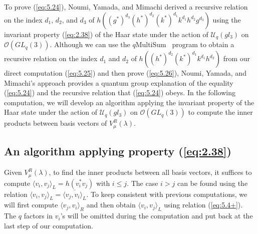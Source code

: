 \documentclass[table,a4paper,reqno]{amsart}
\numberwithin{equation}{section}
\theoremstyle{definition}
\begin{document}
To prove (\ref{eq:5.24}), Noumi, Yamada, and Mimachi derived a recursive relation on the index $d_1$, $d_2$, and $d_3$ of $h((g^*)^{d_3}(h^*)^{d_2}(k^*)^{d_1}k^{d_1}h^{d_2}g^{d_3})$ using the invariant property (\ref{eq:2.38}) of the Haar state under the action of $\mathcal{U}_q(gl_3)$ on $\mathcal{O}(GL_q(3))$. Although we can use the $q$MultiSum~\cite{riese2003qmultisum} program to obtain a recursive relation on the index $d_1$ and $d_2$ of $h((h^*)^{d_2}(k^*)^{d_1}k^{d_1}h^{d_2})$ from our direct computation (\ref{eq:5.25}) and then prove (\ref{eq:5.26}), Noumi, Yamada, and Mimachi's approach provides a quantum group explanation of the equality (\ref{eq:5.24}) and the recursive relation that (\ref{eq:5.24}) obeys. In the following computation, we will develop an algorithm applying the invariant property of the Haar state under the action of $\mathcal{U}_q(gl_3)$ on $\mathcal{O}(GL_q(3))$ to compute the inner products between basis vectors of $V^R_\mu(\lambda)$.

\subsection{An algorithm applying property (\ref{eq:2.38}) }
Given $V_\mu^R(\lambda)$, to find the inner products between all basis vectors, it suffices to compute $\langle v_i,v_j\rangle_L=h(v_i^*v_j)$ with $i\le j$. The case $i>j$ can be found using the relation $\langle v_i,v_j\rangle_L=\overline{\langle v_j,v_i\rangle_L}$. To keep consistent with previous computations, we will first compute $\langle v_j,v_i\rangle_R$ and then obtain $\langle v_i,v_j\rangle_L$ using relation (\ref{eq:5.4+}). The $q$ factors in $v_i$'s will be omitted during the computation and put back at the last step of our computation.
\end{document}
